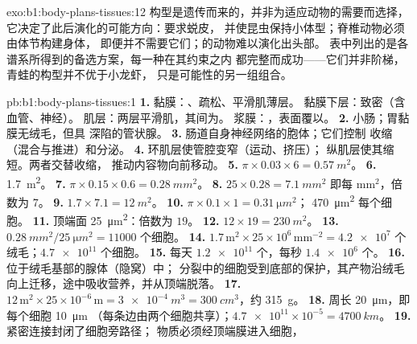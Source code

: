 \begin{solution}{exo:b1:body-plans-tissues:12}
构型是遗传而来的，并非为适应动物的需要而选择，
它决定了此后演化的可能方向：要求蜕皮，
并使昆虫保持小体型；脊椎动物必须由体节构建身体，
即便并不需要它们；的动物难以演化出头部。
表中列出的是各谱系所得到的备选方案，每一种在其约束之内
都完整而成功——它们并非阶梯，
青蛙的构型并不优于小龙虾，
只是可能性的另一组组合。
\end{solution}

\begin{solution}{pb:b1:body-plans-tissues:1}
\textbf{1.} 黏膜：、疏松、平滑肌薄层。
黏膜下层：致密（含血管、神经）。
肌层：两层平滑肌，其间为。
浆膜：，表面覆以。
\textbf{2.} 小肠；胃黏膜无绒毛，但具
深陷的管状腺。
\textbf{3.} 肠道自身神经网络的胞体；它们控制
收缩（混合与推进）和分泌。
\textbf{4.} 环肌层使管腔变窄（运动、挤压）；
纵肌层使其缩短。两者交替收缩，
推动内容物向前移动。
\textbf{5.} $\pi\times 0.03\times 6 = \qty{0.57}{m^2}$。
\textbf{6.} \qty{1.7}{m^2}。
\textbf{7.} $\pi\times 0.15\times 0.6 = \qty{0.28}{mm^2}$。
\textbf{8.} $25\times 0.28 = \qty{7.1}{mm^2}$ 即每 mm$^2$，倍数为 $7$。
\textbf{9.} $1.7\times 7.1 = \qty{12}{m^2}$。
\textbf{10.} $\pi\times 0.1\times 1 = \qty{0.31}{\micro m^2}$；
\qty{470}{\micro m^2} 每个细胞。
\textbf{11.} 顶端面 \qty{25}{\micro m^2}：倍数为 $19$。
\textbf{12.} $12\times 19 = \qty{230}{m^2}$。
\textbf{13.} $\qty{0.28}{mm^2}/\qty{25}{\micro m^2} = \num{11000}$ 个细胞。
\textbf{14.} $1.7\,\mathrm{m^2}\times 25\times 10^6\,\mathrm{mm^{-2}} =
\num{4.2e7}$ 个绒毛；$\num{4.7e11}$ 个细胞。
\textbf{15.} 每天 $\num{1.2e11}$ 个，每秒 $\num{1.4e6}$ 个。
\textbf{16.} 位于绒毛基部的腺体（隐窝）中；
分裂中的细胞受到底部的保护，其产物沿绒毛
向上迁移，途中吸收营养，并从顶端脱落。
\textbf{17.} $12\,\mathrm{m^2}\times 25\times 10^{-6}\,\mathrm{m} =
\qty{3e-4}{m^3} = \qty{300}{cm^3}$，约 \qty{315}{g}。
\textbf{18.} 周长 \qty{20}{\micro m}，即每个细胞 \qty{10}{\micro m}
（每条边由两个细胞共享）；$\num{4.7e11}\times 10^{-5} = \qty{4700}{km}$。
\textbf{19.} 紧密连接封闭了细胞旁路径；
物质必须经顶端膜进入细胞，

\end{solution}
